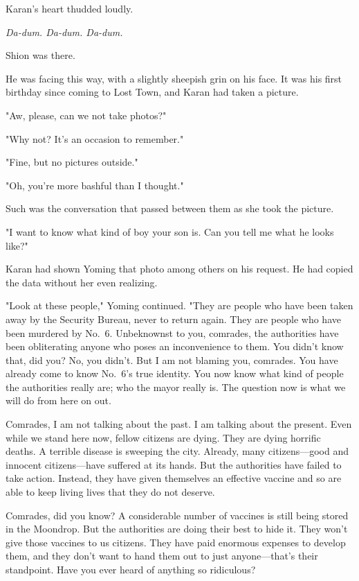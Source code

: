Karan's heart thudded loudly.

\emph{Da-dum. Da-dum. Da-dum.}

Shion was there.

He was facing this way, with a slightly sheepish grin on his face. It
was his first birthday since coming to Lost Town, and Karan had taken a
picture.

"Aw, please, can we not take photos?"

"Why not? It's an occasion to remember."

"Fine, but no pictures outside."

"Oh, you're more bashful than I thought."

Such was the conversation that passed between them as she took the
picture.

"I want to know what kind of boy your son is. Can you tell me what he
looks like?"

Karan had shown Yoming that photo among others on his request. He had
copied the data without her even realizing.

"Look at these people," Yoming continued. "They are people who have been
taken away by the Security Bureau, never to return again. They are
people who have been murdered by No.~6. Unbeknownst to you, comrades,
the authorities have been obliterating anyone who poses an inconvenience
to them. You didn't know that, did you? No, you didn't. But I am not
blaming you, comrades. You have already come to know No.~6's true
identity. You now know what kind of people the authorities really are;
who the mayor really is. The question now is what we will do from here
on out.

Comrades, I am not talking about the past. I am talking about the
present. Even while we stand here now, fellow citizens are dying. They
are dying horrific deaths. A terrible disease is sweeping the city.
Already, many citizens---good and innocent citizens---have suffered at its
hands. But the authorities have failed to take action. Instead, they
have given themselves an effective vaccine and so are able to keep
living lives that they do not deserve.

Comrades, did you know? A considerable number of vaccines is still being
stored in the Moondrop. But the authorities are doing their best to hide
it. They won't give those vaccines to us citizens. They have paid
enormous expenses to develop them, and they don't want to hand them out
to just anyone---that's their standpoint. Have you ever heard of anything
so ridiculous?

